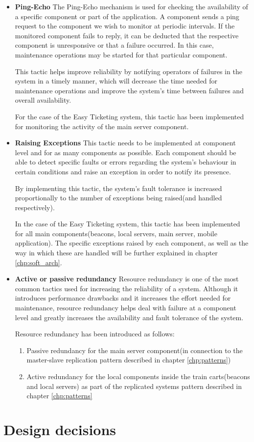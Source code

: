 \begin{itemize}

\item \textbf{Ping-Echo}
The Ping-Echo mechanism is used for checking the availability of a specific component or part of the application. A component sends a ping request to the component we wish to monitor at periodic intervals. If the monitored component fails to reply, it can be deducted that the respective component is unresponsive or that a failure occurred. In this case, maintenance operations may be started for that particular component.

This tactic helps improve reliability by notifying operators of failures in the system in a timely manner, which will decrease the time needed for maintenance operations and improve the system's time between failures and overall availability. 

For the case of the Easy Ticketing system, this tactic has been implemented for monitoring the activity of the main server component.

\item \textbf{Raising Exceptions}
This tactic needs to be implemented at component level and for as many components as possible. Each component should be able to detect specific faults or errors regarding the system's behaviour in certain conditions and raise an exception in order to notify its presence.

By implementing this tactic, the system's fault tolerance is increased proportionally to the number of exceptions being raised(and handled respectively).

In the case of the Easy Ticketing system, this tactic has been implemented for all main components(beacons, local servers, main server, mobile application). The specific exceptions raised by each component, as well as the way in which these are handled will be further explained in chapter \ref{chp:soft_arch}.

\item \textbf{Active or passive redundancy}
Resource redundancy is one of the most common tactics used for increasing the reliability of a system. Although it introduces performance drawbacks and it increases the effort needed for maintenance, resource redundancy helps deal with failure at a component level and greatly increases the availability and fault tolerance of the system.

Resource redundancy has been introduced as follows:
\begin{enumerate}
	\item Passive redundancy for the main server component(in connection to the master-slave replication pattern described in chapter \ref{chp:patterns})
	
	\item Active redundancy for the local components inside the train carts(beacons and local servers) as part of the replicated systems pattern described in chapter \ref{chp:patterns}
\end{enumerate}

\end{itemize}

\section{Design decisions}
\label{chp:design_decisions}
